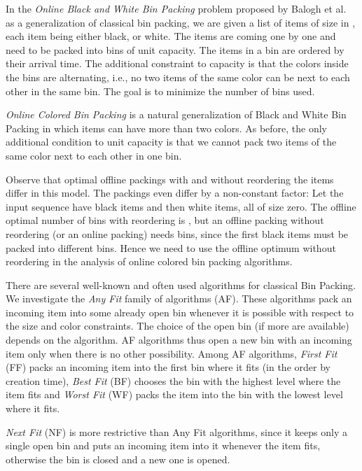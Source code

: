 \documentclass[11pt,a4paper]{article}
\begin{document}
In the \textit{Online Black and White Bin Packing} problem proposed by
Balogh et al.~\cite{balogh13,balogh14} as a generalization of
classical bin packing, we are given a list of items of size in , each item being either black, or white.  The items are coming
one by one and need to be packed into bins of unit capacity.
The items in a bin are ordered by their arrival
time. The additional constraint to capacity is that the
colors inside the bins are alternating, i.e., no two items of the same color
can be next to each other in the same bin.  The goal is to minimize
the number of bins used.

\textit{Online Colored Bin Packing} is a natural generalization of
Black and White Bin Packing in which items can have more than two
colors.  As before, the only additional condition to unit capacity is that we
cannot pack two items of the same color next to each
other in one bin.

Observe that optimal offline packings with and without reordering the
items differ in this model. The packings even differ by a non-constant
factor: Let the input sequence have  black items and then  white
items, all of size zero. The offline optimal number of bins with
reordering is , but an offline packing without reordering (or an
online packing) needs  bins, since the first  black items must
be packed into different bins.  Hence we need to use the offline
optimum without reordering in the analysis of online colored bin
packing algorithms.

There are several well-known and often used algorithms for classical
Bin Packing. We investigate the \textit{Any Fit} family of algorithms (AF). These algorithms
pack an incoming item into some already open bin whenever
it is possible with respect to the size and color constraints.
The choice of the open bin (if more are available) depends on the algorithm.  AF
algorithms thus open a new bin with an incoming item only when there
is no other possibility. Among AF algorithms, \textit{First Fit}
(FF) packs an incoming item into the first bin where it fits (in the
order by creation time), \textit{Best Fit} (BF) chooses the bin with
the highest level where the item fits and \textit{Worst Fit} (WF)
packs the item into the bin with the lowest level where it fits.

\textit{Next Fit} (NF) is more restrictive than Any Fit algorithms,
since it keeps only a single open bin and puts an incoming item into
it whenever the item fits, otherwise the bin is closed and a new one
is opened.
\end{document}
